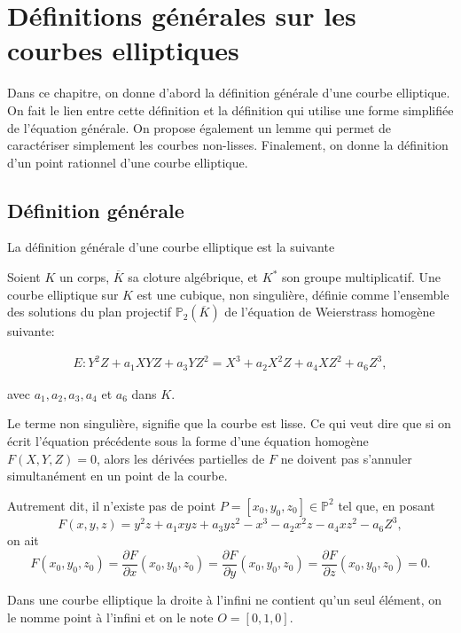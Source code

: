 \chapter{Définitions générales sur les courbes elliptiques}
\begin{center}
    Dans ce chapitre, on donne d'abord la définition générale d'une courbe elliptique. On fait
    le lien entre cette définition et la définition qui utilise une forme simplifiée de
    l'équation générale. On propose également un lemme qui permet de caractériser simplement les courbes
    non-lisses. Finalement, on donne la définition d'un point rationnel d'une courbe
    elliptique.
\end{center}

\section{Définition générale}

La définition générale d'une courbe elliptique est la suivante
\begin{definition}
    Soient $K$ un corps, $\overline{K}$ sa cloture algébrique, et $K^{*}$ son groupe
    multiplicatif. Une courbe elliptique sur $K$ est une cubique, non singulière,
    définie comme l'ensemble des solutions du plan projectif $\mathbb{P}_{2}(\overline{K})$ de
    l'équation de Weierstrass homogène suivante:

\begin{align}
\label{eq:geneEll}
E: Y^2Z+a_1XYZ+a_3YZ^2 = X^3 +a_2X^2Z+a_4XZ^2+a_6Z^3
,\end{align}

avec $a_1,a_2,a_3,a_4$ et $a_6$ dans $K$.
\end{definition}
Le terme non singulière, signifie que la courbe est lisse. Ce qui veut dire que si on écrit
l'équation précédente sous la forme d'une équation homogène $F(X,Y,Z)=0$, alors les dérivées
partielles de $F$ ne doivent pas s'annuler simultanément en un point de la courbe.

Autrement dit, il n'existe pas de point $P = \left[ x_0,y_0,z_0 \right] \in \mathbb{P}^2$ tel
que, en posant
\[
F(x,y,z) = y^2z+a_1xyz+a_3yz^2 - x^3-a_2x^2z-a_4xz^2-a_6Z^3
,\] 
on ait
\[
F(x_0,y_0,z_0)=\frac{\partial{F}}{\partial{x}}(x_0,y_0,z_0) =
\frac{\partial{F}}{\partial{y}}(x_0,y_0,z_0) =
\frac{\partial{F}}{\partial{z}}(x_0,y_0,z_0) = 0
.\] 

Dans une courbe elliptique la droite à l'infini ne contient qu'un seul élément, on le nomme
point à l'infini et on le note $O = [0,1,0]$.

